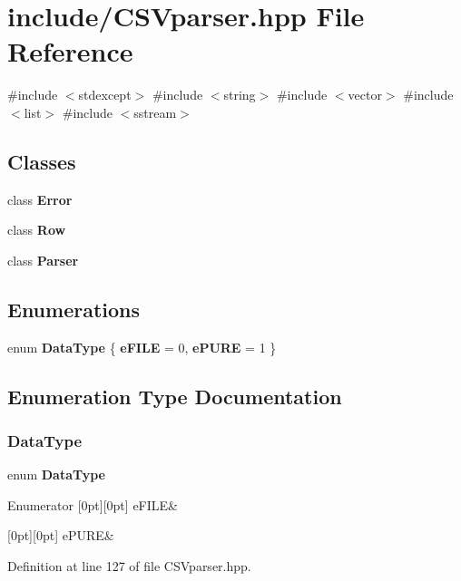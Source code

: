 \section{include/\+C\+S\+Vparser.hpp File Reference}
\label{_c_s_vparser_8hpp}
{\ttfamily \#include $<$stdexcept$>$}\newline
{\ttfamily \#include $<$string$>$}\newline
{\ttfamily \#include $<$vector$>$}\newline
{\ttfamily \#include $<$list$>$}\newline
{\ttfamily \#include $<$sstream$>$}\newline
\subsection*{Classes}
\begin{DoxyCompactItemize}
\item 
class \textbf{ Error}
\item 
class \textbf{ Row}
\item 
class \textbf{ Parser}
\end{DoxyCompactItemize}
\subsection*{Enumerations}
\begin{DoxyCompactItemize}
\item 
enum \textbf{ Data\+Type} \{ \textbf{ e\+F\+I\+LE} = 0, 
\textbf{ e\+P\+U\+RE} = 1
 \}
\end{DoxyCompactItemize}


\subsection{Enumeration Type Documentation}
\mbox{\label{_c_s_vparser_8hpp_ad8ed01ff3ff33333d8e19db4d2818bb6}} 
\subsubsection{DataType}
{\footnotesize\ttfamily enum \textbf{ Data\+Type}}

\begin{DoxyEnumFields}{Enumerator}
[0pt][0pt]{}\mbox{\label{_c_s_vparser_8hpp_ad8ed01ff3ff33333d8e19db4d2818bb6a99e2aefa5a03705fd10b8b72e081349f}} 
e\+F\+I\+LE&\\
\hline

[0pt][0pt]{}\mbox{\label{_c_s_vparser_8hpp_ad8ed01ff3ff33333d8e19db4d2818bb6aef7f347978c58a657566792291ec1e4b}} 
e\+P\+U\+RE&\\
\hline

\end{DoxyEnumFields}


Definition at line 127 of file C\+S\+Vparser.\+hpp.

